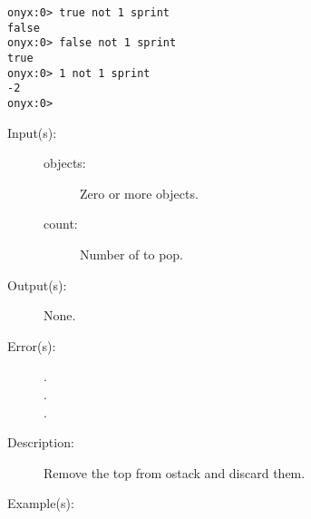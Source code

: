 \begin{description}
\begin{description}
\begin{verbatim}
onyx:0> true not 1 sprint
false
onyx:0> false not 1 sprint
true
onyx:0> 1 not 1 sprint
-2
onyx:0>
		\end{verbatim}
	\end{description}
\label{systemdict:npop}
\item[{\onyxop{objects count}{npop}{--}}: ]
	\begin{description}\item[]
	\item[Input(s): ]
		\begin{description}\item[]
		\item[objects: ]
			Zero or more objects.
		\item[count: ]
			Number of  to pop.
		\end{description}
	\item[Output(s): ] None.
	\item[Error(s): ]
		\begin{description}\item[]
		\item[.]
		\item[.]
		\item[.]
		\end{description}
	\item[Description: ]
		Remove the top   from ostack and
		discard them.
	\item[Example(s): ]\begin{verbatim}


\end{verbatim}
\end{description}
\end{description}
